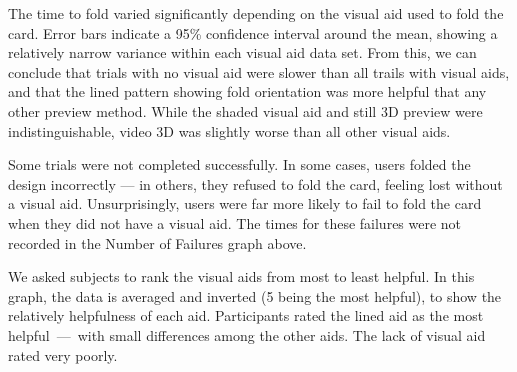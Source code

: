 The time to fold varied significantly depending on the visual aid used
to fold the card. Error bars indicate a 95\% confidence interval around
the mean, showing a relatively narrow variance within each visual aid
data set. From this, we can conclude that trials with no visual aid were
slower than all trails with visual aids, and that the lined pattern
showing fold orientation was more helpful that any other preview method.
While the shaded visual aid and still 3D preview were indistinguishable,
video 3D was slightly worse than all other visual aids.


Some trials were not completed successfully. In some cases, users folded
the design incorrectly --- in others, they refused to fold the card,
feeling lost without a visual aid. Unsurprisingly, users were far more
likely to fail to fold the card when they did not have a visual aid. The
times for these failures were not recorded in the Number of Failures
graph above.


We asked subjects to rank the visual aids from most to least helpful. In
this graph, the data is averaged and inverted (5 being the most
helpful), to show the relatively helpfulness of each aid. Participants
rated the lined aid as the most helpful~---~with small differences among
the other aids. The lack of visual aid rated very poorly.

